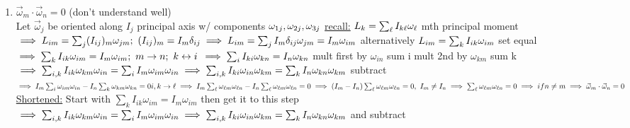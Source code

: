 \documentclass[12pt]{amsart}
\begin{document}
\begin{enumerate}
\hdashrule[0.5ex][c]{\linewidth}{0.5pt}{1.5mm}


\item \underline{$\vec{\omega}_m \cdot \vec{\omega}_n=0$} (don't understand well)\\
Let $\vec{\omega}_j$ be oriented along $I_j$ principal axis w/ components $\omega_{1 j}, \omega_{2 j} , \omega_{3 j}\\$
\underline{recall:} $L_k= \sum_{\ell} I_{k \ell} \omega_{\ell}\\$
mth principal moment $\implies L_{im} = \sum_j (I_{ij})_m \omega_{jm} ;\,\, (I_{ij})_m = I_m \delta_{ij}\\
\implies L_{im} = \sum_j I_m \delta_{ij} \omega_{jm} = I_m \omega_{im}\\$
alternatively $L_{im} = \sum_k I_{ik} \omega_{im}\\$
set equal $\implies \sum_k I_{ik} \omega_{im} = I_m \omega_{im};\,\, m \rightarrow n;\,\, k \leftrightarrow i\\$
$\implies \sum_i I_{ki}  \omega_{kn} = I_n \omega_{kn}\\$
mult first by $\omega_{in}$ sum i mult 2nd by $\omega_{km}$ sum k\\
$\implies \sum_{i,k} I_{ik} \omega_{km} \omega_{in} = \sum_i I_m \omega_{im} \omega_{in}\\
\implies \sum_{i,k} I_{ki} \omega_{in} \omega_{km} = \sum_k I_n \omega_{kn} \omega_{km}\\$
subtract\\
$\implies I_m \sum_i \omega_{im} \omega_{in} - I_n \sum_k \omega_{km} \omega_{kn} = 0\\
i,k \rightarrow \ell\\
\implies I_m \sum_{\ell} \omega_{\ell m} \omega_{\ell n} - I_n \sum_{\ell} \omega_{\ell m} \omega_{\ell n} = 0\\
\implies (I_m - I_n) \sum_{\ell} \omega_{\ell m} \omega_{\ell n} = 0,\,\, I_m \neq I_n\\
\implies \sum_{\ell} \omega_{\ell m} \omega_{\ell n} = 0 \implies if n \neq m\\
\implies \vec{\omega}_m \cdot \vec{\omega}_n=0\\$
\\
\underline{Shortened:} Start with $\sum_k I_{ik} \omega_{im} = I_m \omega_{im}$ then get it to this step\\
$\implies \sum_{i,k} I_{ik} \omega_{km} \omega_{in} = \sum_i I_m \omega_{im} \omega_{in}\\
\implies \sum_{i,k} I_{ki} \omega_{in} \omega_{km} = \sum_k I_n \omega_{kn} \omega_{km}\\$
and subtract



\end{enumerate}
\end{document}
